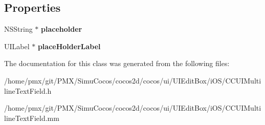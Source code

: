 \subsection*{Properties}
\begin{DoxyCompactItemize}
\item 
\mbox{\label{interfaceCCUIMultilineTextField_a53c03ae4d6871fc7549a77faa75fa961}} 
N\+S\+String $\ast$ {\bfseries placeholder}
\item 
\mbox{\label{interfaceCCUIMultilineTextField_a806ffd5ddb97c533ef7807ee389d92a2}} 
U\+I\+Label $\ast$ {\bfseries place\+Holder\+Label}
\end{DoxyCompactItemize}


The documentation for this class was generated from the following files\+:\begin{DoxyCompactItemize}
\item 
/home/pmx/git/\+P\+M\+X/\+Simu\+Cocos/cocos2d/cocos/ui/\+U\+I\+Edit\+Box/i\+O\+S/C\+C\+U\+I\+Multiline\+Text\+Field.\+h\item 
/home/pmx/git/\+P\+M\+X/\+Simu\+Cocos/cocos2d/cocos/ui/\+U\+I\+Edit\+Box/i\+O\+S/C\+C\+U\+I\+Multiline\+Text\+Field.\+mm\end{DoxyCompactItemize}
